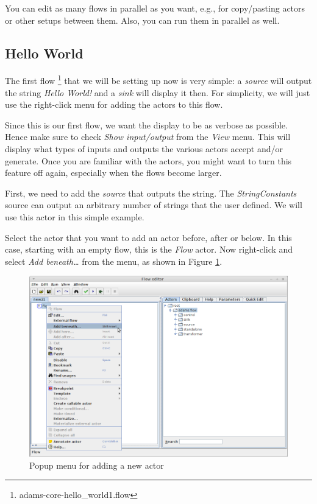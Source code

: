 You can edit as many flows in parallel as you want, e.g., for copy/pasting
actors or other setups between them. Also, you can run them in parallel as well.

\clearpage
\subsection{Hello World}
The first flow \footnote{adams-core-hello\_world1.flow} that we will be setting
up now is very simple: a \textit{source} will output the string \textit{Hello World!} and a \textit{sink} will display
it then. For simplicity, we will just use the right-click menu for adding the
actors to this flow.

Since this is our first flow, we want the display to be as
verbose as possible. Hence make sure to check \textit{Show input/output} from
the \textit{View} menu. This will display what types of inputs and outputs the
various actors accept and/or generate. Once you are familiar with the actors,
you might want to turn this feature off again, especially when the flows become
larger.

First, we need to add the \textit{source} that outputs the string. The
\textit{StringConstants} source can output an arbitrary number of strings that
the user defined. We will use this actor in this simple example.

Select the actor that you want to add an actor before, after or
below. In this case, starting with an empty flow, this is the
\textit{Flow} actor. Now right-click and select \textit{Add beneath\ldots} from
the menu, as shown in Figure \ref{floweditor-helloworld-addactor1}.

\begin{figure}[htb]
  \centering
  \includegraphics[width=12.0cm]{images/floweditor-helloworld-addactor1.png}
  \caption{Popup menu for adding a new actor}
  \label{floweditor-helloworld-addactor1}
\end{figure}


